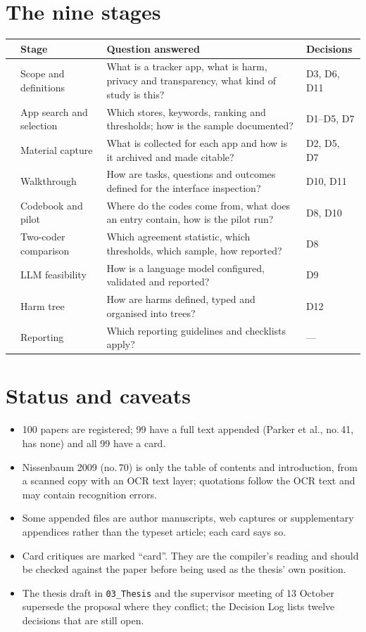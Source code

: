 \section*{The nine stages}
\begin{table}[h]
\centering\small
\begin{tabularx}{\textwidth}{@{}c P{3.4cm} Y P{2.2cm}@{}}
\toprule
 & \textbf{Stage} & \textbf{Question answered} & \textbf{Decisions}\\
\midrule
{} & Scope and definitions & What is a tracker app, what is harm, privacy and transparency, what kind of study is this? & D3, D6, D11\\
 & App search and selection & Which stores, keywords, ranking and thresholds; how is the sample documented? & D1--D5, D7\\
 & Material capture & What is collected for each app and how is it archived and made citable? & D2, D5, D7\\
 & Walkthrough & How are tasks, questions and outcomes defined for the interface inspection? & D10, D11\\
 & Codebook and pilot & Where do the codes come from, what does an entry contain, how is the pilot run? & D8, D10\\
 & Two-coder comparison & Which agreement statistic, which thresholds, which sample, how reported? & D8\\
 & LLM feasibility & How is a language model configured, validated and reported? & D9\\
 & Harm tree & How are harms defined, typed and organised into trees? & D12\\
 & Reporting & Which reporting guidelines and checklists apply? & ---\\
\bottomrule
\end{tabularx}
\end{table}

\section*{Status and caveats}
\begin{itemize}
\item 100 papers are registered; 99 have a full text appended (Parker et al., no.\,41, has none) and all 99 have a card.
\item Nissenbaum 2009 (no.\,70) is only the table of contents and introduction, from a scanned copy with an OCR text layer; quotations follow the OCR text and may contain recognition errors.
\item Some appended files are author manuscripts, web captures or supplementary appendices rather than the typeset article; each card says so.
\item Card critiques are marked ``card''. They are the compiler's reading and should be checked against the paper before being used as the thesis' own position.
\item The thesis draft in \texttt{03\_Thesis} and the supervisor meeting of 13 October supersede the proposal where they conflict; the Decision Log lists twelve decisions that are still open.
\end{itemize}
